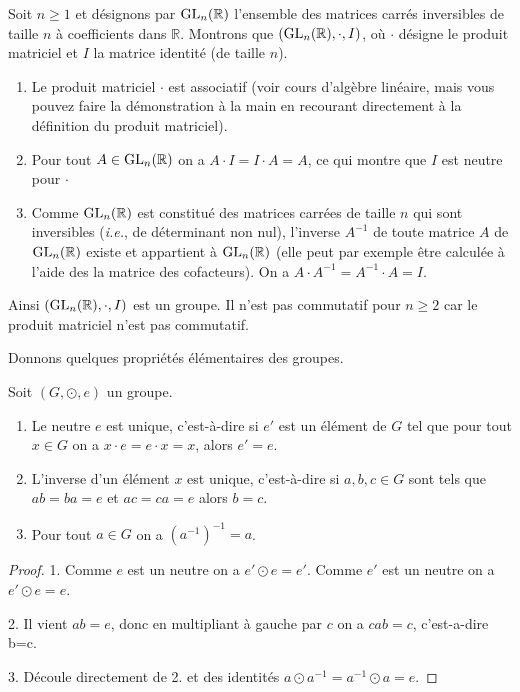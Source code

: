 \documentclass[french,course,oneside,theoremnosection]{lecture}
\newcommand{\R}{\mathbb{R}}
\begin{document}
\begin{example}
Soit $n\geq 1$ et désignons par $\GL_n(\R)$ l'ensemble des matrices carrés inversibles de taille $n$ à coefficients dans $\R$. Montrons que $(\GL_n(\R), \cdot,  I)$, où $\cdot$ désigne le produit matriciel et $I$ la matrice identité (de taille $n$).
\begin{enumerate}
\item Le produit matriciel $\cdot$ est associatif (voir cours d'algèbre linéaire, mais vous pouvez faire la démonstration à la main en recourant directement à la définition du produit matriciel).
\item Pour tout $A  \in \GL_n(\R)$ on a $A\cdot I = I  \cdot A=A$, ce qui montre que $I$ est neutre pour $\cdot$
\item Comme $\GL_n(\R)$ est constitué des matrices carrées de taille $n$ qui sont inversibles (\emph{i.e.}, de déterminant non nul), l'inverse $A^{-1}$ de toute matrice $A$ de $\GL_n(\R)$ existe et appartient à $\GL_n(\R)$ (elle peut par exemple être calculée à l'aide des la matrice des cofacteurs). On a $A\cdot A^{-1}=A^{-1} \cdot A= I$.
\end{enumerate}

Ainsi $(\GL_n(\R), \cdot,  I)$ est un groupe. Il n'est pas commutatif pour $n\geq 2$ car le produit matriciel n'est pas commutatif.
\end{example}

Donnons quelques propriétés élémentaires des groupes.

\begin{proposition}
Soit $(G, \odot,  e)$ un groupe.
\begin{enumerate}
\item Le neutre $e$ est unique, c'est-à-dire si $e'$ est un élément de $G$ tel que pour tout $x\in G$ on a $x\cdot e = e \cdot x = x$, alors $e'=e$.
\item L'inverse d'un élément $x$ est unique, c'est-à-dire si $a, b, c \in G$ sont tels que $ab=ba=e$ et $ac=ca=e$ alors $b=c$. 
\item Pour tout $a\in G$ on a $(a^{-1})^{-1} =a$.
\end{enumerate}
\end{proposition}
\begin{proof}
1. Comme $e$ est un neutre on a $e'\odot e=e'$. Comme $e'$ est un neutre on a $e'\odot e= e$.

2. Il vient $ab=e$, donc en multipliant à gauche par $c$ on a $cab=c$, c'est-a-dire b=c.

3. Découle directement de 2. et des identités $a\odot a^{-1}=a^{-1}\odot a =e$.
\end{proof}
\end{document}
